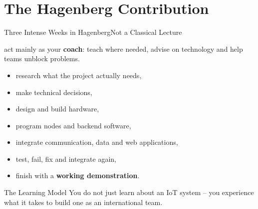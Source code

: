 \part[nopartpage]{The Hagenberg Contribution}

\begin{frame}{Three Intense Weeks in Hagenberg}{Not a Classical Lecture}
\begin{description}
    \item[I will] act mainly as your \textbf{coach}: teach where needed, advise on technology and help teams unblock problems.
    \item[You will]
    \begin{itemize}
        \item research what the project actually needs,
        \item make technical decisions,
        \item design and build hardware,
        \item program nodes and backend software,
        \item integrate communication, data and web applications,
        \item test, fail, fix and integrate again,
        \item finish with a \textbf{working demonstration}.
    \end{itemize}
\end{description}
\begin{block}{The Learning Model}
You do not just learn about an IoT system -- you experience what it takes to build one as an international team.
\end{block}
\end{frame}
